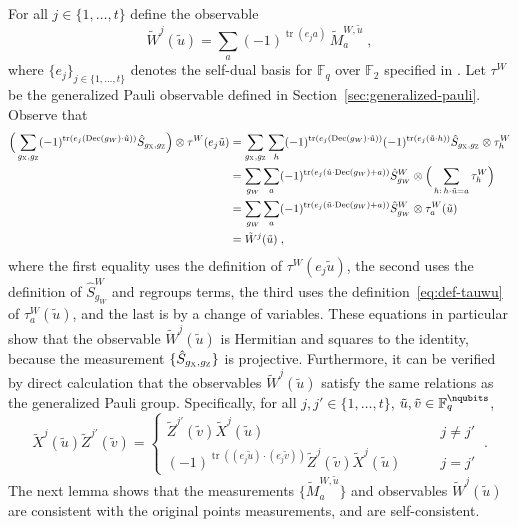 \documentclass[11pt]{article}
\theoremstyle{definition}
\newcommand{\F}{\ensuremath{\mathbb{F}}}
\DeclareMathOperator{\tr}{tr}
\newcommand{\labelstyle}[1]{\ensuremath{\textsc{#1}}\xspace}
\newcommand{\xpt}{\labelstyle{X}}
\newcommand{\zpt}{\labelstyle{Z}}
\newcommand{\coded}{\mathrm{Dec}}
\begin{document}
	For all $j \in \{1,\ldots,t\}$ define the observable
	\begin{equation}\label{eq:def-tildewj}
		\tilde{W}^j(\tilde{u}) = \sum_a (-1)^{\tr(e_j a)} \, \tilde{M}_a^{W,\tilde{u}} \;,
	\end{equation}
	where $\{e_j\}_{j \in \{1,\ldots,t\}}$ denotes the self-dual basis for $\F_q$ over $\F_2$ specified in . Let $\tau^W$ be the generalized Pauli observable defined in Section~\ref{sec:generalized-pauli}. Observe that
	\begin{align*}
	\Big ( \sum_{g_\xpt,g_\zpt} (-1)^{\tr(e_j (\coded(g_W) \cdot \tilde{u}))} \hat{S}_{g_\xpt,g_\zpt} \Big ) \otimes \tau^W(e_j \tilde{u})
	&= \sum_{g_\xpt,g_\zpt} \sum_h (-1)^{\tr(e_j (\coded(g_W) \cdot \tilde{u}))} (-1)^{\tr(e_j(\tilde{u} \cdot h))} \hat{S}_{g_\xpt,g_\zpt} \otimes \tau^W_h\\
	&= \sum_{g_W} \sum_a  (-1)^{\tr(e_j (\tilde{u} \cdot\coded(g_W) + a))} \hat{S}_{g_W}^W \otimes \Big( \sum_{h:\, h\cdot \tilde{u} = a}\tau^W_h\Big)\\
		&= \sum_{g_W} \sum_a  (-1)^{\tr(e_j (\tilde{u} \cdot\coded(g_W) + a))} \hat{S}_{g_W}^W \otimes \tau^W_a(\tilde{u})\\
		&= 		\tilde{W}^j(\tilde{u}) \;,
	\end{align*}
	where the first equality uses the definition of $\tau^W(e_j \tilde{u})$, the second uses the definition of $\hat{S}^W_{g_W}$ and regroups terms, the third uses the definition~\eqref{eq:def-tauwu} of $\tau^W_a(\tilde{u})$, and the last is by a change of variables. These equations in particular show that the observable $\tilde{W}^j(\tilde{u})$ is Hermitian and squares to the identity, because the measurement $\{ \hat{S}_{g_\xpt,g_\zpt} \}$ is projective. 
	Furthermore, it can be verified by direct calculation that the observables $\tilde{W}^j(\tilde{u})$ satisfy the same relations as the generalized Pauli group. Specifically, for all $j,j' \in \{1,\ldots,t\}$, $\tilde{u}, \tilde{v} \in \F_q^\nqubits$,
	\[
		\tilde{X}^j(\tilde{u}) \tilde{Z}^{j'}(\tilde{v}) = \begin{cases}
		\tilde{Z}^{j'}(\tilde{v}) \tilde{X}^j(\tilde{u})  & \qquad j \neq j' \\
		(-1)^{\tr((e_j \tilde{u}) \cdot (e_j \tilde{v}))} \tilde{Z}^{j}(\tilde{v}) \tilde{X}^j(\tilde{u}) & \qquad j = j'
		\end{cases}~.
	\]
	The next lemma shows that the measurements $\{ \tilde{M}^{W,\tilde{u}}_a \}$  and observables $\tilde{W}^j(\tilde{u})$  are consistent with the original points measurements, and are self-consistent. 
	
\end{document}
